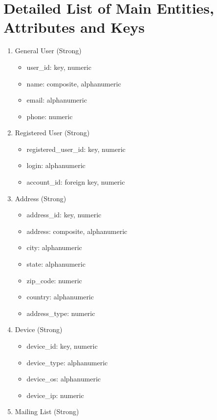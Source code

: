 \pagebreak
\section{Detailed List of Main Entities, Attributes and Keys}

\begin{enumerate}
\item General User (Strong)
    \begin{itemize}
        \item user\_id: key, numeric
        \item name: composite, alphanumeric
        \item email: alphanumeric
        \item phone: numeric
    \end{itemize}
\item Registered User (Strong)
    \begin{itemize}
        \item registered\_user\_id: key, numeric
        \item login: alphanumeric
        \item account\_id: foreign key, numeric
    \end{itemize}
\item Address (Strong)
    \begin{itemize}
        \item address\_id: key, numeric
        \item address: composite, alphanumeric
        \item city: alphanumeric
        \item state: alphanumeric
        \item zip\_code: numeric
        \item country: alphanumeric
        \item address\_type: numeric
    \end{itemize}
\item Device (Strong)
    \begin{itemize}
        \item device\_id: key, numeric
        \item device\_type: alphanumeric
        \item device\_os: alphanumeric
        \item device\_ip: numeric
    \end{itemize}
\item Mailing List (Strong)
    \begin{itemize}

\end{itemize}
\end{enumerate}
